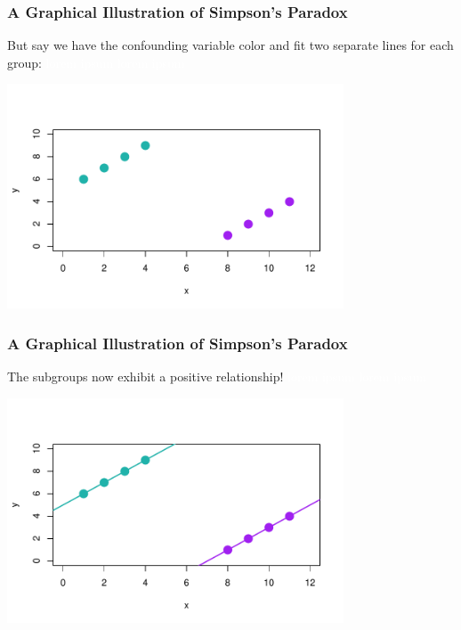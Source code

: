 \documentclass[handout]{beamer}
\newcommand{\blue}[1]{\textcolor{blue2}{#1}}
\begin{document}
\begin{frame}
\frametitle{A Graphical Illustration of Simpson's Paradox}
But say we have the \blue{confounding} variable color and fit two separate lines for each group: \textcolor{white}{lorem ipsum lorem ipsum}
\begin{center}
\includegraphics[width=10cm]{figure/simpsons3.pdf}
\end{center}

\end{frame}



\begin{frame}
\frametitle{A Graphical Illustration of Simpson's Paradox}
The subgroups now exhibit a \blue{positive} relationship! \textcolor{white}{lorem ipsum lorem ipsum}
\begin{center}
\includegraphics[width=10cm]{figure/simpsons4.pdf}
\end{center}

\end{frame}
\end{document}

